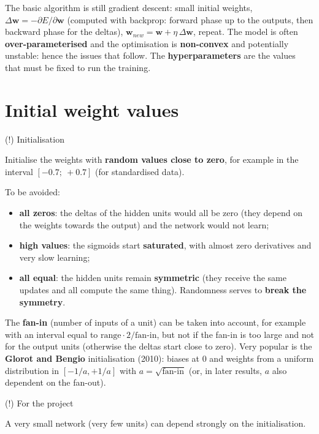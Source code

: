 The basic algorithm is still gradient descent: small initial weights,
\(\Delta\mathbf{w} = -\partial E/\partial\mathbf{w}\) (computed with
backprop: forward phase up to the outputs, then backward phase for the
deltas), \(\mathbf{w}_{new} = \mathbf{w} + \eta\,\Delta\mathbf{w}\),
repeat. The model is often \textbf{over-parameterised} and the
optimisation is \textbf{non-convex} and potentially unstable: hence the
issues that follow. The \textbf{hyperparameters} are the values that
must be fixed to run the training.

\section{Initial weight values}\label{valori-iniziali-dei-pesi}

\begin{boxtip}{(!) Initialisation}

Initialise the weights with \textbf{random values close to zero}, for
example in the interval \([-0.7;\ +0.7]\) (for standardised data).

\end{boxtip}

To be avoided:

\begin{itemize}
\tightlist
\item
  \textbf{all zeros}: the deltas of the hidden units would all be zero
  (they depend on the weights towards the output) and the network would
  not learn;
\item
  \textbf{high values}: the sigmoids start \textbf{saturated}, with
  almost zero derivatives and very slow learning;
\item
  \textbf{all equal}: the hidden units remain \textbf{symmetric} (they
  receive the same updates and all compute the same thing). Randomness
  serves to \textbf{break the symmetry}.
\end{itemize}

The \textbf{fan-in} (number of inputs of a unit) can be taken into
account, for example with an interval equal to
\(\text{range}\cdot 2/\text{fan-in}\), but not if the fan-in is too
large and not for the output units (otherwise the deltas start close to
zero). Very popular is the \textbf{Glorot and Bengio} initialisation
(2010): biases at 0 and weights from a uniform distribution in
\([-1/a, +1/a]\) with \(a = \sqrt{\text{fan-in}}\) (or, in later
results, \(a\) also dependent on the fan-out).

\begin{boxnote}{(!) For the project}

A very small network (very few units) can depend strongly on the
initialisation.

\end{boxnote}

